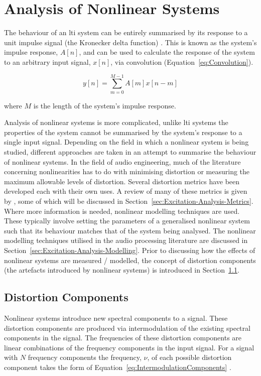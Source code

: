 \section{Analysis of Nonlinear Systems}
\label{sec:Excitation-AnalysisOfNonlinearSystems}
	The behaviour of an \acrshort{lti} system can be entirely summarised by its response to a unit impulse signal (the
	Kronecker delta function) \citep{phillips2007signals}. This is known as the system's impulse response, $A[n]$, and
	can be used to calculate the response of the system to an arbitrary input signal, $x[n]$, via convolution
	(Equation~\ref{eq:Convolution}).

	\begin{equation}
		y[n] = \sum_{m = 0}^{M - 1} A[m]x[n-m]
		\label{eq:Convolution}
	\end{equation}

	where $M$ is the length of the system's impulse response.
	
	Analysis of nonlinear systems is more complicated, unlike \acrshort{lti} systems the properties of the system
	cannot be summarised by the system's response to a single input signal. Depending on the field in which a nonlinear
	system is being studied, different approaches are taken in an attempt to summarise the behaviour of nonlinear
	systems. In the field of audio engineering, much of the literature concerning nonlinearities has to do with
	minimising distortion or measuring the maximum allowable levels of distortion. Several distortion metrics have been
	developed each with their own uses. A review of many of these metrics is given by \citet{voishvillo2006assessment},
	some of which will be discussed in Section~\ref{sec:Excitation-Analysis-Metrics}.  Where more information is
	needed, nonlinear modelling techniques are used.  These typically involve setting the parameters of a generalised
	nonlinear system such that its behaviour matches that of the system being analysed. The nonlinear modelling
	techniques utilised in the audio processing literature are discussed in
	Section~\ref{sec:Excitation-Analysis-Modelling}. Prior to discussing how the effects of nonlinear systems are
	measured / modelled, the concept of distortion components (the artefacts introduced by nonlinear systems) is
	introduced in Section~\ref{sec:Excitation-Analysis-Components}.

	\subsection{Distortion Components}
	\label{sec:Excitation-Analysis-Components}
		Nonlinear systems introduce new spectral components to a signal. These distortion components are produced
		via intermodulation of the existing spectral components in the signal. The frequencies of these distortion
		components are linear combinations of the frequency components in the input signal. For a signal with $N$
		frequency components the frequency, $\nu$, of each possible distortion component takes the form of
		Equation~\ref{eq:IntermodulationComponents} \citep{hulick2005solid}.

